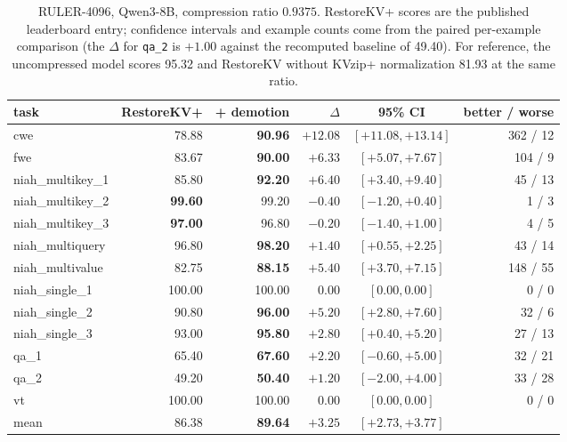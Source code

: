 \documentclass[11pt]{article}
\begin{document}
\begin{table}[t]
\centering
\small
\setlength{\tabcolsep}{4pt}
\begin{tabular}{lrrrcr}
\toprule
task & RestoreKV+ & + demotion & $\Delta$ & 95\% CI & better / worse \\
\midrule
cwe & 78.88 & \textbf{90.96} & $+12.08$ & $[+11.08, +13.14]$ & 362 / 12 \\
fwe & 83.67 & \textbf{90.00} & $+6.33$ & $[+5.07, +7.67]$ & 104 / 9 \\
niah\_multikey\_1 & 85.80 & \textbf{92.20} & $+6.40$ & $[+3.40, +9.40]$ & 45 / 13 \\
niah\_multikey\_2 & \textbf{99.60} & 99.20 & $-0.40$ & $[-1.20, +0.40]$ & 1 / 3 \\
niah\_multikey\_3 & \textbf{97.00} & 96.80 & $-0.20$ & $[-1.40, +1.00]$ & 4 / 5 \\
niah\_multiquery & 96.80 & \textbf{98.20} & $+1.40$ & $[+0.55, +2.25]$ & 43 / 14 \\
niah\_multivalue & 82.75 & \textbf{88.15} & $+5.40$ & $[+3.70, +7.15]$ & 148 / 55 \\
niah\_single\_1 & 100.00 & 100.00 & $0.00$ & $[0.00, 0.00]$ & 0 / 0 \\
niah\_single\_2 & 90.80 & \textbf{96.00} & $+5.20$ & $[+2.80, +7.60]$ & 32 / 6 \\
niah\_single\_3 & 93.00 & \textbf{95.80} & $+2.80$ & $[+0.40, +5.20]$ & 27 / 13 \\
qa\_1 & 65.40 & \textbf{67.60} & $+2.20$ & $[-0.60, +5.00]$ & 32 / 21 \\
qa\_2 & 49.20 & \textbf{50.40} & $+1.20$ & $[-2.00, +4.00]$ & 33 / 28 \\
vt & 100.00 & 100.00 & $0.00$ & $[0.00, 0.00]$ & 0 / 0 \\
\midrule
mean & 86.38 & \textbf{89.64} & $+3.25$ & $[+2.73, +3.77]$ & \\
\bottomrule
\end{tabular}
\caption{RULER-4096, Qwen3-8B, compression ratio $0.9375$. RestoreKV+ scores are the published leaderboard entry; confidence
intervals and example counts come from the paired per-example comparison (the $\Delta$ for \texttt{qa\_2} is $+1.00$ against the
recomputed baseline of 49.40). For reference, the uncompressed model scores 95.32 and RestoreKV without KVzip+ normalization 81.93
at the same ratio.}
\label{tab:main}
\end{table}
\end{document}
